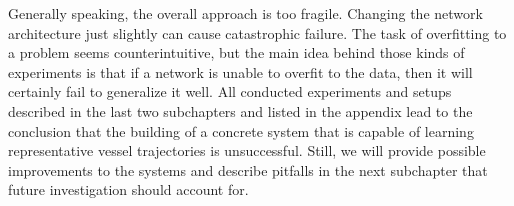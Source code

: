 Generally speaking, the overall approach is too fragile. Changing the network architecture just slightly can cause catastrophic failure. The task of overfitting to a problem seems counterintuitive, but the main idea behind those kinds of experiments is that if a network is unable to overfit to the data, then it will certainly fail to generalize it well. All conducted experiments and setups described in the last two subchapters and listed in the appendix lead to the conclusion that the building of a concrete system that is capable of learning representative vessel trajectories is unsuccessful. Still, we will provide possible improvements to the systems and describe pitfalls in the next subchapter that future investigation should account for.